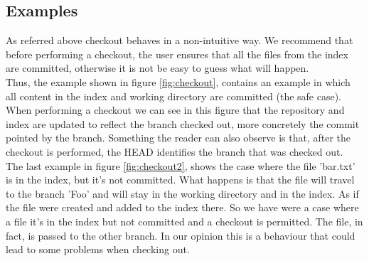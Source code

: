 \subsection{Examples}
As referred above checkout behaves in a non-intuitive way. We recommend that
before performing a checkout, the user ensures that all the files from
the index are committed, otherwise it is not be easy to guess what will happen.\\

Thus, the example shown in figure \ref{fig:checkout}, contains an
example in which all content in the index and working directory are committed (the safe case).
When performing a checkout we can see in this figure 
that the repository and index are updated to reflect the branch checked out, more
concretely the commit pointed by the branch. Something the reader can
also observe is that, after the checkout is performed, the HEAD
identifies the branch that was checked out.\\
The last example in figure \ref{fig:checkout2}, shows the case where the file
'bar.txt' is in the index, but it's not committed. What happens is that the file
will travel to the branch 'Foo' and will stay in the working directory and in the
index. As if the file were created and added to the index there. So we have were
a case where a file it's in the index but not committed and a checkout is
permitted. The file, in fact, is passed to the other branch. In our opinion this
is a behaviour that could lead to some problems when checking out. \\

